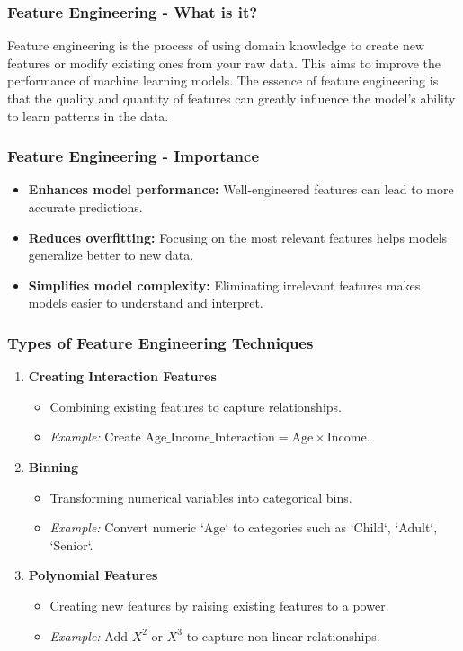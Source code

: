 \documentclass{beamer}
\begin{document}
\begin{frame}[fragile]
    \frametitle{Feature Engineering - What is it?}
    Feature engineering is the process of using domain knowledge to create new features or modify existing ones from your raw data. 
    This aims to improve the performance of machine learning models. The essence of feature engineering is that the quality and quantity of features can greatly influence the model's ability to learn patterns in the data.
\end{frame}

\begin{frame}[fragile]
    \frametitle{Feature Engineering - Importance}
    \begin{itemize}
        \item \textbf{Enhances model performance:} Well-engineered features can lead to more accurate predictions.
        \item \textbf{Reduces overfitting:} Focusing on the most relevant features helps models generalize better to new data.
        \item \textbf{Simplifies model complexity:} Eliminating irrelevant features makes models easier to understand and interpret.
    \end{itemize}
\end{frame}

\begin{frame}[fragile]
    \frametitle{Types of Feature Engineering Techniques}
    \begin{enumerate}
        \item \textbf{Creating Interaction Features}
            \begin{itemize}
                \item Combining existing features to capture relationships.
                \item \textit{Example:} Create \( \text{Age\_Income\_Interaction} = \text{Age} \times \text{Income} \).
            \end{itemize}

        \item \textbf{Binning}
            \begin{itemize}
                \item Transforming numerical variables into categorical bins.
                \item \textit{Example:} Convert numeric `Age` to categories such as `Child`, `Adult`, `Senior`.
            \end{itemize}

        \item \textbf{Polynomial Features}
            \begin{itemize}
                \item Creating new features by raising existing features to a power.
                \item \textit{Example:} Add \( X^2 \) or \( X^3 \) to capture non-linear relationships.
            \end{itemize}
    \end{enumerate}
\end{frame}
\end{document}
